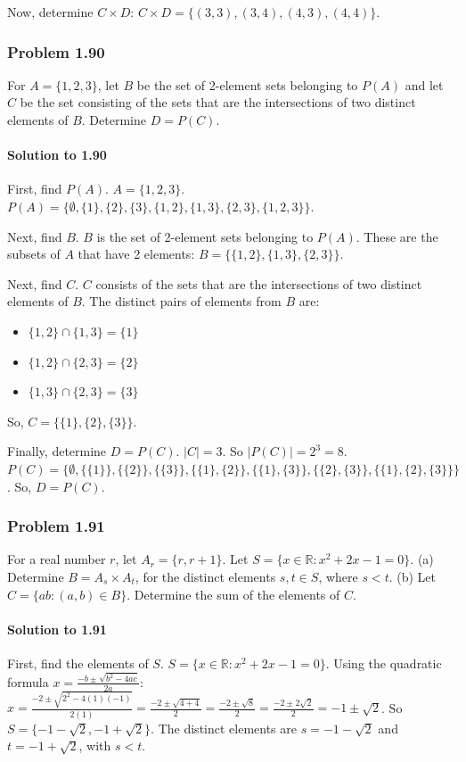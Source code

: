 \documentclass{article}
\begin{document}
\begin{itemize}
\begin{itemize}
\begin{itemize}
Now, determine $C \times D$:
$C \times D = \{ (3,3), (3,4), (4,3), (4,4) \}$.

\subsubsection*{Problem 1.90}
For $A = \{1, 2, 3\}$, let $B$ be the set of 2-element sets belonging to $P(A)$ and let $C$ be the set consisting of the sets that are the intersections of two distinct elements of $B$. Determine $D = P(C)$.

\paragraph*{Solution to 1.90}
First, find $P(A)$.
$A = \{1, 2, 3\}$.
$P(A) = \{\emptyset, \{1\}, \{2\}, \{3\}, \{1, 2\}, \{1, 3\}, \{2, 3\}, \{1, 2, 3\}\}$.

Next, find $B$. $B$ is the set of 2-element sets belonging to $P(A)$.
These are the subsets of $A$ that have 2 elements:
$B = \{\{1, 2\}, \{1, 3\}, \{2, 3\}\}$.

Next, find $C$. $C$ consists of the sets that are the intersections of two distinct elements of $B$.
The distinct pairs of elements from $B$ are:
\begin{itemize}
    \item $\{1, 2\} \cap \{1, 3\} = \{1\}$
    \item $\{1, 2\} \cap \{2, 3\} = \{2\}$
    \item $\{1, 3\} \cap \{2, 3\} = \{3\}$
\end{itemize}
So, $C = \{\{1\}, \{2\}, \{3\}\}$.

Finally, determine $D = P(C)$.
$|C| = 3$. So $|P(C)| = 2^3 = 8$.
$P(C) = \{\emptyset, \{\{1\}\}, \{\{2\}\}, \{\{3\}\}, \{\{1\}, \{2\}\}, \{\{1\}, \{3\}\}, \{\{2\}, \{3\}\}, \{\{1\}, \{2\}, \{3\}\}\}$.
So, $D = P(C)$.

\subsubsection*{Problem 1.91}
For a real number $r$, let $A_r = \{r, r+1\}$. Let $S = \{x \in \mathbb{R} : x^2 + 2x - 1 = 0\}$.
(a) Determine $B = A_s \times A_t$, for the distinct elements $s, t \in S$, where $s < t$.
(b) Let $C = \{ab : (a, b) \in B\}$. Determine the sum of the elements of $C$.

\paragraph*{Solution to 1.91}
First, find the elements of $S$.
$S = \{x \in \mathbb{R} : x^2 + 2x - 1 = 0\}$.
Using the quadratic formula $x = \frac{-b \pm \sqrt{b^2 - 4ac}}{2a}$:
$x = \frac{-2 \pm \sqrt{2^2 - 4(1)(-1)}}{2(1)} = \frac{-2 \pm \sqrt{4 + 4}}{2} = \frac{-2 \pm \sqrt{8}}{2} = \frac{-2 \pm 2\sqrt{2}}{2} = -1 \pm \sqrt{2}$.
So $S = \{-1 - \sqrt{2}, -1 + \sqrt{2}\}$.
The distinct elements are $s = -1 - \sqrt{2}$ and $t = -1 + \sqrt{2}$, with $s < t$.


\end{itemize}
\end{itemize}
\end{itemize}
\end{document}
